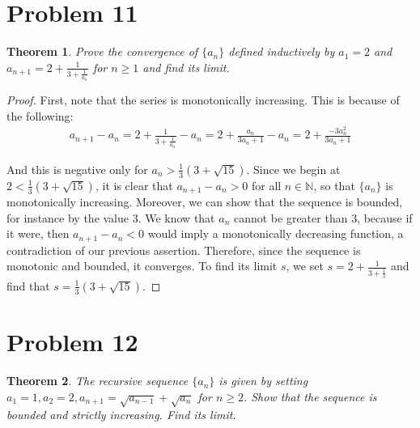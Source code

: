 \documentclass[psamsfonts]{amsart}
\newtheorem{thm}{Theorem}[section]
\theoremstyle{definition}
\theoremstyle{remark}
\numberwithin{equation}{section}
\begin{document}
\section{Problem 11}

\begin{thm}
Prove the convergence of $\{ a_n \}$ defined inductively by $a_1 = 2$ and $a_{n+1} = 2 + \frac{1}{3 + \frac{1}{a_n}}$ for $ n \geq 1$ and find its limit.
\end{thm}

\begin{proof}
First, note that the series is monotonically increasing. This is because of the following:
\begin{eqnarray}
a_{n+1} - a_n = 2 + \frac{1}{3 + \frac{1}{a_n}} - a_n = 2 + \frac{a_n}{3 a_n + 1} - a_n = 2 + \frac{-3 a_n^2}{3 a_n + 1}
\end{eqnarray}

And this is negative only for $a_n > \frac{1}{3} ( 3 + \sqrt{15} )$. Since we begin at $2 < \frac{1}{3}( 3 + \sqrt{15})$, it is clear that $a_{n+1} - a_n > 0$ for all $n \in \mathbb{N}$, so that $\{ a_n \}$ is monotonically increasing. Moreover, we can show that the sequence is bounded, for instance by the value $3$. We know that $a_n$ cannot be greater than $3$, because if it were, then $a_{n+1} - a_n < 0$ would imply a monotonically decreasing function, a contradiction of our previous assertion. Therefore, since the sequence is monotonic and bounded, it converges. To find its limit $s$, we set $s = 2 + \frac{1}{3 + \frac{1}{s}}$ and find that $s = \frac{1}{3} ( 3 + \sqrt{15})$.  
\end{proof}

\section{Problem 12}

\begin{thm}
The recursive sequence $\{ a_n \}$ is given by setting $a_1 = 1, a_2 = 2, a_{n+1} = \sqrt{a_{n-1}} + \sqrt{a_n}$ for $n \geq 2$. Show that the sequence is bounded and strictly increasing. Find its limit.
\end{thm}
\end{document}
